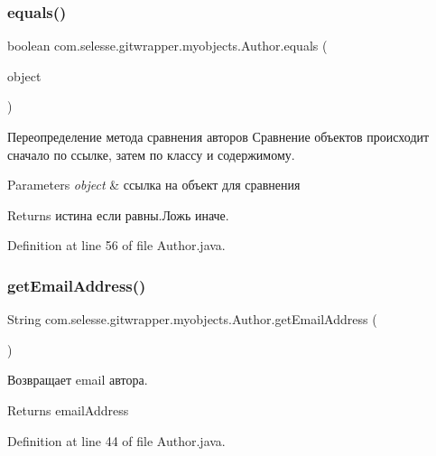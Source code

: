 \subsubsection{\texorpdfstring{equals()}{equals()}}
{\footnotesize\ttfamily boolean com.\+selesse.\+gitwrapper.\+myobjects.\+Author.\+equals (\begin{DoxyParamCaption}\item[{Object}]{object }\end{DoxyParamCaption})}

Переопределение метода сравнения авторов Сравнение объектов происходит сначало по ссылке, затем по классу и содержимому.


\begin{DoxyParams}{Parameters}
{\em object} & ссылка на объект для сравнения \\
\hline
\end{DoxyParams}
\begin{DoxyReturn}{Returns}
истина если равны.\+Ложь иначе. 
\end{DoxyReturn}


Definition at line 56 of file Author.\+java.

\mbox{\label{classcom_1_1selesse_1_1gitwrapper_1_1myobjects_1_1_author_a42225ddc9f30e05c24cf0e986e2188e7}} 
\subsubsection{\texorpdfstring{get\+Email\+Address()}{getEmailAddress()}}
{\footnotesize\ttfamily String com.\+selesse.\+gitwrapper.\+myobjects.\+Author.\+get\+Email\+Address (\begin{DoxyParamCaption}{ }\end{DoxyParamCaption})}

Возвращает email автора.

\begin{DoxyReturn}{Returns}
email\+Address 
\end{DoxyReturn}


Definition at line 44 of file Author.\+java.

\mbox{\label{classcom_1_1selesse_1_1gitwrapper_1_1myobjects_1_1_author_aed9dd31a6e46a7f0aed1ac480e8abdb1}} 
